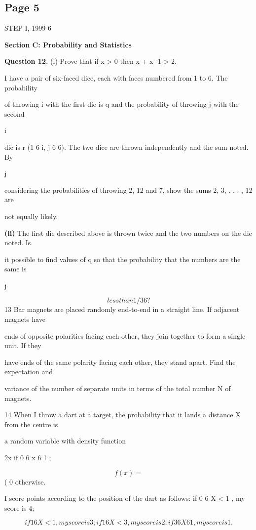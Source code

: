 \documentclass[12pt]{article}
\begin{document}
\subsection*{Page 5}
\begin{flushleft}
STEP I, 1999 6\par
\bigskip\textbf{Section C: Probability and Statistics}\par
\bigskip\textbf{Question 12.} (i) Prove that if x > 0 then x + x -1 > 2.\par
I have a pair of six-faced dice, each with faces numbered from 1 to 6. The probability\par
of throwing i with the first die is q and the probability of throwing j with the second\par
i\par
die is r (1 6 i, j 6 6). The two dice are thrown independently and the sum noted. By\par
j\par
considering the probabilities of throwing 2, 12 and 7, show the sums 2, 3, . . . , 12 are\par
not equally likely.\par
\textbf{(ii)} The first die described above is thrown twice and the two numbers on the die noted. Is\par
it possible to find values of q so that the probability that the numbers are the same is\par
j\par
\[less than 1/36?\]
13 Bar magnets are placed randomly end-to-end in a straight line. If adjacent magnets have\par
ends of opposite polarities facing each other, they join together to form a single unit. If they\par
have ends of the same polarity facing each other, they stand apart. Find the expectation and\par
variance of the number of separate units in terms of the total number N of magnets.\par
14 When I throw a dart at a target, the probability that it lands a distance X from the centre is\par
a random variable with density function\par
2x if 0 6 x 6 1 ;\par
\[f (x) =\]
( 0 otherwise.\par
I score points according to the position of the dart as follows: if 0 6 X < 1 , my score is 4;\par
\[if 1 6 X < 1 , my score is 3; if 1 6 X < 3 , my score is 2; if 3 6 X 6 1, my score is 1.\]

\end{flushleft}
\end{document}
